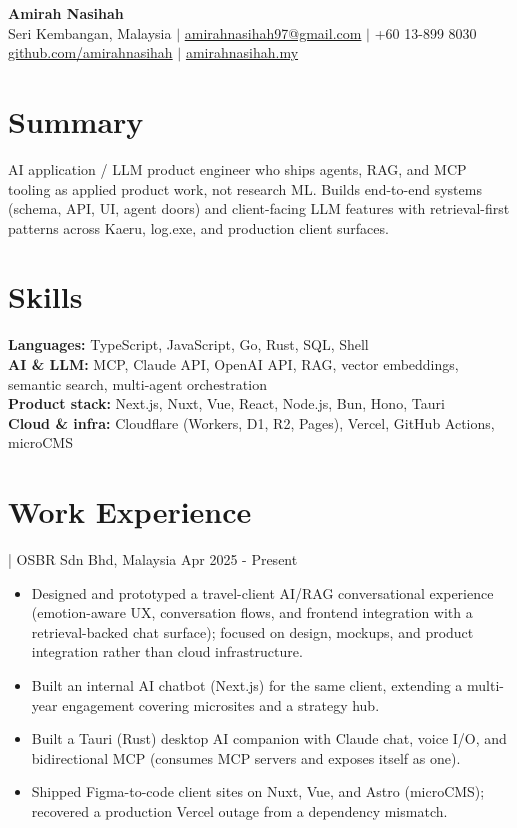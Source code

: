 \documentclass[11pt]{article}
\newcommand{\job}[4]{%
  \vspace{2pt}{\bfseries #1} | #2#3 \hfill #4\par}
\begin{document}
\begin{center}
{\LARGE\bfseries Amirah Nasihah}\\[3pt]
Seri Kembangan, Malaysia $\vert$
\href{mailto:amirahnasihah97@gmail.com}{amirahnasihah97@gmail.com} $\vert$
+60 13-899 8030\\[1pt]
\href{https://github.com/amirahnasihah}{github.com/amirahnasihah} $\vert$
\href{https://amirahnasihah.my}{amirahnasihah.my}
\end{center}

\section{Summary}
AI application / LLM product engineer who ships agents, RAG, and MCP tooling as
applied product work, not research ML. Builds end-to-end systems (schema, API,
UI, agent doors) and client-facing LLM features with retrieval-first patterns
across Kaeru, log.exe, and production client surfaces.

\section{Skills}
\textbf{Languages:} TypeScript, JavaScript, Go, Rust, SQL, Shell\\
\textbf{AI \& LLM:} MCP, Claude API, OpenAI API, RAG, vector embeddings,
semantic search, multi-agent orchestration\\
\textbf{Product stack:} Next.js, Nuxt, Vue, React, Node.js, Bun, Hono, Tauri\\
\textbf{Cloud \& infra:} Cloudflare (Workers, D1, R2, Pages), Vercel,
GitHub Actions, microCMS

\section{Work Experience}

\job{Jr. Frontend Developer}{OSBR Sdn Bhd}{, Malaysia}{Apr 2025 - Present}
\begin{itemize}
  \item Designed and prototyped a travel-client AI/RAG conversational experience
        (emotion-aware UX, conversation flows, and frontend integration with a
        retrieval-backed chat surface); focused on design, mockups, and product
        integration rather than cloud infrastructure.
  \item Built an internal AI chatbot (Next.js) for the same client, extending a
        multi-year engagement covering microsites and a strategy hub.
  \item Built a Tauri (Rust) desktop AI companion with Claude chat, voice I/O,
        and bidirectional MCP (consumes MCP servers and exposes itself as one).
  \item Shipped Figma-to-code client sites on Nuxt, Vue, and Astro (microCMS);
        recovered a production Vercel outage from a dependency mismatch.
\end{itemize}
\end{document}
